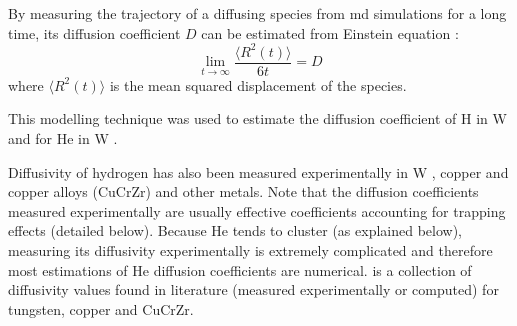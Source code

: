 By measuring the trajectory of a diffusing species from \gls{md} simulations for a long time, its diffusion coefficient $D$ can be estimated from Einstein equation \cite{einstein_uber_1905}:
\begin{equation}
    \lim_{t\to\infty} \frac{\langle R^2(t) \rangle}{6t} = D
\end{equation}
where $\langle R^2(t) \rangle$ is the mean squared displacement of the species.

This modelling technique was used to estimate the diffusion coefficient of \gls{H} in \gls{W}  and for He in \gls{W} .

Diffusivity of hydrogen has also been measured experimentally in \gls{W} , copper and copper alloys (CuCrZr)  and other metals.
Note that the diffusion coefficients measured experimentally are usually effective coefficients accounting for \gls{trapping} effects (detailed below).
Because He tends to cluster (as explained below), measuring its diffusivity experimentally is extremely complicated and therefore most estimations of He diffusion coefficients are numerical.
 is a collection of diffusivity values found in literature (measured experimentally or computed) for tungsten, copper and CuCrZr.


